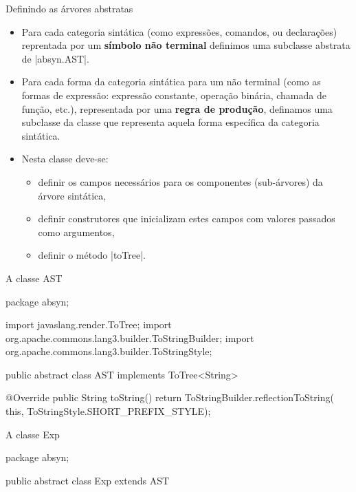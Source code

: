 \begin{frame}{Definindo as árvores abstratas}
  \begin{itemize}
    \item Para cada \alert{categoria sintática} (como expressões,
    comandos, ou declarações) reprentada por um \textbf{símbolo não
      terminal} definimos uma subclasse abstrata de
    \pyginline|absyn.AST|.
    \item Para cada \alert{forma} da categoria sintática para um não
    terminal (como as formas de expressão: expressão constante,
    operação binária, chamada de função, etc.), representada por uma
    \textbf{regra de produção}, definamos uma subclasse da classe que
    representa aquela forma específica da categoria sintática.
    \item 
    Nesta classe deve-se:
    \begin{itemize}
      \item definir os \alert{campos} necessários para os componentes
      (sub-árvores) da árvore sintática,
      \item definir \alert{construtores} que inicializam estes campos
      com valores passados como argumentos,
      \item definir o método \pyginline|toTree|.
    \end{itemize}
  \end{itemize}
\end{frame}

\begin{frame}{A classe AST}
\begin{pygmented}[]
package absyn;

import javaslang.render.ToTree;
import org.apache.commons.lang3.builder.ToStringBuilder;
import org.apache.commons.lang3.builder.ToStringStyle;

public abstract class AST implements ToTree<String> {

   @Override
   public String toString() {
      return ToStringBuilder.reflectionToString(
                 this,
                 ToStringStyle.SHORT_PREFIX_STYLE);
   }

}
\end{pygmented}
\end{frame}

\begin{frame}{A classe Exp}
\begin{pygmented}[]
package absyn;

public abstract class Exp extends AST {
}
\end{pygmented}
\end{frame}


